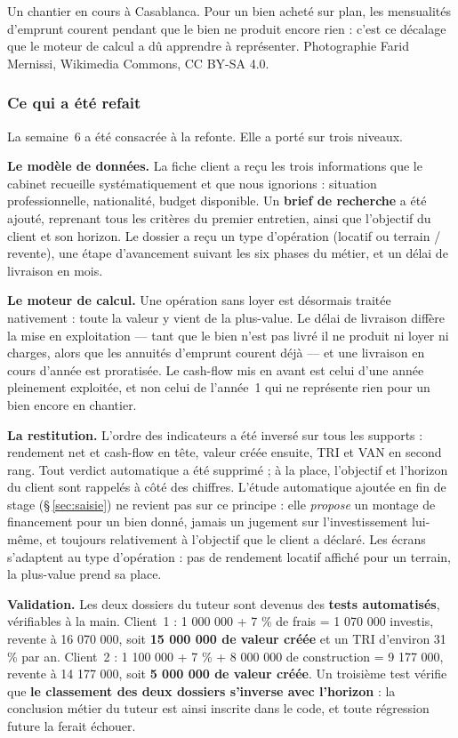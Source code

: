 \documentclass[12pt,a4paper]{article}
\begin{document}
{Un chantier en cours à Casablanca. Pour un bien acheté sur plan, les mensualités
	d'emprunt courent pendant que le bien ne produit encore rien : c'est ce
	décalage que le moteur de calcul a dû apprendre à représenter.}
{Photographie Farid Mernissi, Wikimedia Commons, CC BY-SA 4.0.}

\subsubsection{Ce qui a été refait}

La semaine~6 a été consacrée à la refonte. Elle a porté sur trois niveaux.

\textbf{Le modèle de données.} La fiche client a reçu les trois informations que
le cabinet recueille systématiquement et que nous ignorions : situation
professionnelle, nationalité, budget disponible. Un \textbf{brief de recherche} a
été ajouté, reprenant tous les critères du premier entretien, ainsi que
l'objectif du client et son horizon. Le dossier a reçu un type d'opération
(locatif ou terrain / revente), une étape d'avancement suivant les six phases du
métier, et un délai de livraison en mois.

\textbf{Le moteur de calcul.} Une opération sans loyer est désormais traitée
nativement : toute la valeur y vient de la plus-value. Le délai de livraison
diffère la mise en exploitation --- tant que le bien n'est pas livré il ne
produit ni loyer ni charges, alors que les annuités d'emprunt courent déjà --- et
une livraison en cours d'année est proratisée. Le cash-flow mis en avant est
celui d'une année pleinement exploitée, et non celui de l'année~1 qui ne
représente rien pour un bien encore en chantier.

\textbf{La restitution.} L'ordre des indicateurs a été inversé sur tous les
supports : rendement net et cash-flow en tête, valeur créée ensuite, TRI et VAN
en second rang. Tout verdict automatique a été supprimé ; à la place, l'objectif
et l'horizon du client sont rappelés à côté des chiffres. L'étude automatique
ajoutée en fin de stage (\S\,\ref{sec:saisie}) ne revient pas sur ce principe : elle
\emph{propose} un montage de financement pour un bien donné, jamais un jugement
sur l'investissement lui-même, et toujours relativement à l'objectif que le
client a déclaré. Les écrans s'adaptent
au type d'opération : pas de rendement locatif affiché pour un terrain, la
plus-value prend sa place.

\begin{encadrecle}
	\textbf{Validation.} Les deux dossiers du tuteur sont devenus des
	\textbf{tests automatisés}, vérifiables à la main. Client~1 : 1 000 000 + 7 \%
	de frais = 1 070 000 investis, revente à 16 070 000, soit
	\textbf{15 000 000 de valeur créée} et un TRI d'environ 31 \% par an.
	Client~2 : 1 100 000 + 7 \% + 8 000 000 de construction = 9 177 000, revente à
	14 177 000, soit \textbf{5 000 000 de valeur créée}. Un troisième test vérifie
	que \textbf{le classement des deux dossiers s'inverse avec l'horizon} : la
	conclusion métier du tuteur est ainsi inscrite dans le code, et toute
	régression future la ferait échouer.
\end{encadrecle}
\end{document}
